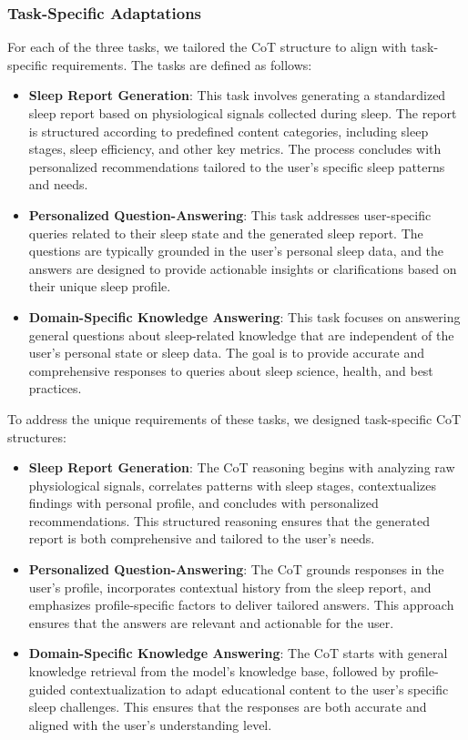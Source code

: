 \documentclass[preprint,12pt]{elsarticle}
\begin{document}
\subsubsection{Task-Specific Adaptations}

For each of the three tasks, we tailored the CoT structure to align with task-specific requirements. The tasks are defined as follows:

\begin{itemize}
    \item \textbf{Sleep Report Generation}:  
    This task involves generating a standardized sleep report based on physiological signals collected during sleep. The report is structured according to predefined content categories, including sleep stages, sleep efficiency, and other key metrics. The process concludes with personalized recommendations tailored to the user's specific sleep patterns and needs.

    \item \textbf{Personalized Question-Answering}:  
    This task addresses user-specific queries related to their sleep state and the generated sleep report. The questions are typically grounded in the user's personal sleep data, and the answers are designed to provide actionable insights or clarifications based on their unique sleep profile.

    \item \textbf{Domain-Specific Knowledge Answering}:  
    This task focuses on answering general questions about sleep-related knowledge that are independent of the user's personal state or sleep data. The goal is to provide accurate and comprehensive responses to queries about sleep science, health, and best practices.
\end{itemize}

To address the unique requirements of these tasks, we designed task-specific CoT structures:

\begin{itemize}
    \item \textbf{Sleep Report Generation}:  
    The CoT reasoning begins with analyzing raw physiological signals, correlates patterns with sleep stages, contextualizes findings with personal profile, and concludes with personalized recommendations. This structured reasoning ensures that the generated report is both comprehensive and tailored to the user's needs.

    \item \textbf{Personalized Question-Answering}:  
    The CoT grounds responses in the user's profile, incorporates contextual history from the sleep report, and emphasizes profile-specific factors to deliver tailored answers. This approach ensures that the answers are relevant and actionable for the user.

    \item \textbf{Domain-Specific Knowledge Answering}:  
    The CoT starts with general knowledge retrieval from the model's knowledge base, followed by profile-guided contextualization to adapt educational content to the user's specific sleep challenges. This ensures that the responses are both accurate and aligned with the user's understanding level.
\end{itemize}
\end{document}
